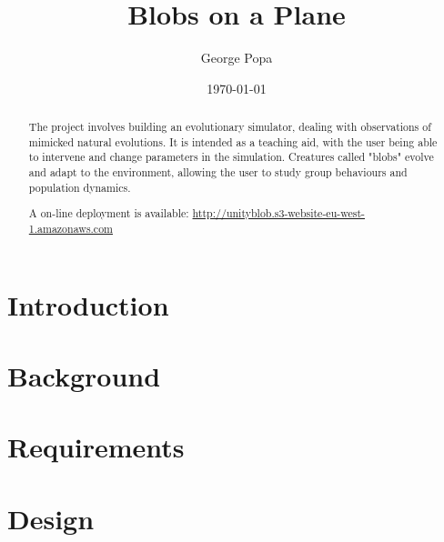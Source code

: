 \documentclass{l4proj}
\begin{document}
\title{Blobs on a Plane}

\author{George Popa}

\date{\today}
\maketitle
\begin{abstract}

The project involves building an evolutionary simulator, dealing with observations of mimicked natural evolutions. It is intended as a teaching aid, with the user being able to intervene and change parameters in the simulation. Creatures called "blobs" evolve and adapt to the environment, allowing the user to study group behaviours and population dynamics.

A on-line deployment is available: \url{http://unityblob.s3-website-eu-west-1.amazonaws.com}

\end{abstract}

\tableofcontents


\chapter{Introduction}
\label{introduction}



\chapter{Background}
\label{background}



\chapter{Requirements}
\label{requirements}



\chapter{Design}
\label{design}

\end{document}
